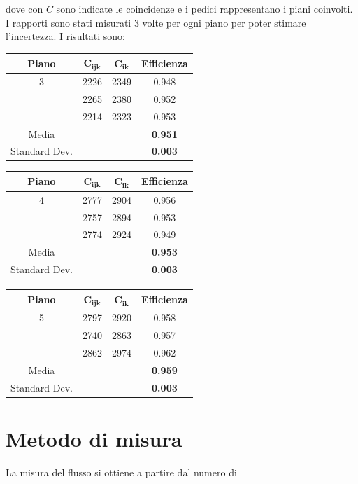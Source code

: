 \documentclass[11pt]{article}
\begin{document}
dove con $C$ sono indicate le coincidenze e i pedici rappresentano i piani coinvolti. I
rapporti sono stati misurati 3 volte per ogni piano per poter stimare l'incertezza. I risultati sono: \\
\vspace{1 cm}

\begin{tabular}{|c|c|c|c|}
\hline 
\textbf{Piano} & $\mathbf{C_{ijk}}$ & $\mathbf{C_{ik}}$ & \textbf{Efficienza} \\ 
\hline 
3 & 2226 & 2349 & 0.948 \\ 
\hline 
\hphantom & 2265 & 2380 & 0.952 \\ 
\hline 
\hphantom & 2214 & 2323 & 0.953 \\ 
\hline 
Media & \hphantom & \hphantom & \textbf{0.951} \\ 
\hline 
Standard Dev. & \hphantom & \hphantom & \textbf{0.003} \\ 
\hline 
\end{tabular} 

\begin{tabular}{|c|c|c|c|}
\hline 
\textbf{Piano} & $\mathbf{C_{ijk}}$ & $\mathbf{C_{ik}}$ & \textbf{Efficienza} \\
\hline 
4 & 2777 & 2904 & 0.956 \\ 
\hline 
\hphantom & 2757 & 2894 & 0.953 \\ 
\hline 
\hphantom & 2774 & 2924 & 0.949 \\ 
\hline 
Media & \hphantom & \hphantom & \textbf{0.953} \\ 
\hline 
Standard Dev. & \hphantom & \hphantom & \textbf{0.003} \\ 
\hline 
\end{tabular} 

\begin{tabular}{|c|c|c|c|}
\hline 
\textbf{Piano} & $\mathbf{C_{ijk}}$ & $\mathbf{C_{ik}}$ & \textbf{Efficienza} \\
\hline 
5 & 2797 & 2920 & 0.958 \\ 
\hline 
\hphantom & 2740 & 2863 & 0.957 \\ 
\hline 
\hphantom & 2862 & 2974 & 0.962 \\ 
\hline 
Media & \hphantom & \hphantom & \textbf{0.959} \\ 
\hline 
Standard Dev. & \hphantom & \hphantom & \textbf{0.003} \\ 
\hline 
\end{tabular} 

\section{Metodo di misura}
La misura del flusso si ottiene a partire dal numero di 
\end{document}
